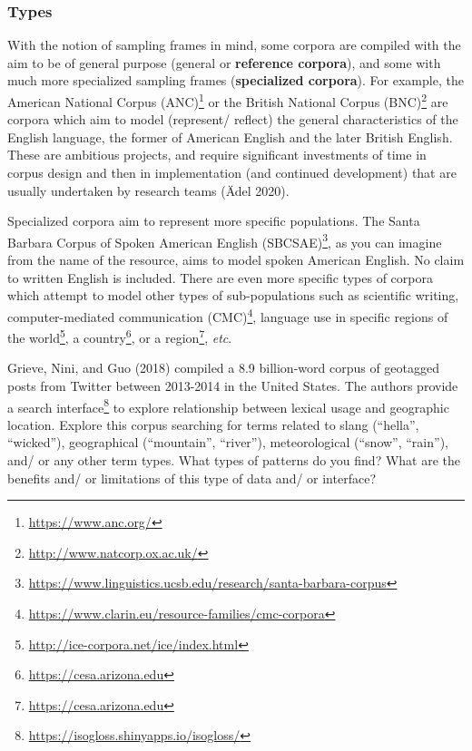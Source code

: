 \documentclass[
  letterpaper,
]{scrbook}
\DeclareRobustCommand{\href}[2]{#2\footnote{\url{#1}}}
\begin{document}
\hypertarget{types}{%
\subsubsection{Types}\label{types}}

With the notion of sampling frames in mind, some corpora are compiled
with the aim to be of general purpose (general or \textbf{reference
corpora}), and some with much more specialized sampling frames
(\textbf{specialized corpora}). For example, the
\href{https://www.anc.org/}{American National Corpus (ANC)} or the
\href{http://www.natcorp.ox.ac.uk/}{British National Corpus (BNC)} are
corpora which aim to model (represent/ reflect) the general
characteristics of the English language, the former of American English
and the later British English. These are ambitious projects, and require
significant investments of time in corpus design and then in
implementation (and continued development) that are usually undertaken
by research teams (Ädel 2020).

Specialized corpora aim to represent more specific populations. The
\href{https://www.linguistics.ucsb.edu/research/santa-barbara-corpus}{Santa
Barbara Corpus of Spoken American English (SBCSAE)}, as you can imagine
from the name of the resource, aims to model spoken American English. No
claim to written English is included. There are even more specific types
of corpora which attempt to model other types of sub-populations such as
scientific writing,
\href{https://www.clarin.eu/resource-families/cmc-corpora}{computer-mediated
communication (CMC)}, language use in specific
\href{http://ice-corpora.net/ice/index.html}{regions of the world}, a
\href{https://cesa.arizona.edu}{country}, or a
\href{https://cesa.arizona.edu}{region}, \emph{etc}.

\begin{tcolorbox}[enhanced jigsaw, title=\textcolor{quarto-callout-important-color}{\faExclamation}\hspace{0.5em}{Consider}, titlerule=0mm, toptitle=1mm, colbacktitle=quarto-callout-important-color!10!white, bottomtitle=1mm, left=2mm, colframe=quarto-callout-important-color-frame, breakable, toprule=.15mm, colback=white, opacitybacktitle=0.6, leftrule=.75mm, rightrule=.15mm, bottomrule=.15mm, arc=.35mm, coltitle=black, opacityback=0]

Grieve, Nini, and Guo (2018) compiled a 8.9 billion-word corpus of
geotagged posts from Twitter between 2013-2014 in the United States. The
authors provide a \href{https://isogloss.shinyapps.io/isogloss/}{search
interface} to explore relationship between lexical usage and geographic
location. Explore this corpus searching for terms related to slang
(``hella'', ``wicked''), geographical (``mountain'', ``river''),
meteorological (``snow'', ``rain''), and/ or any other term types. What
types of patterns do you find? What are the benefits and/ or limitations
of this type of data and/ or interface?

\end{tcolorbox}
\end{document}
